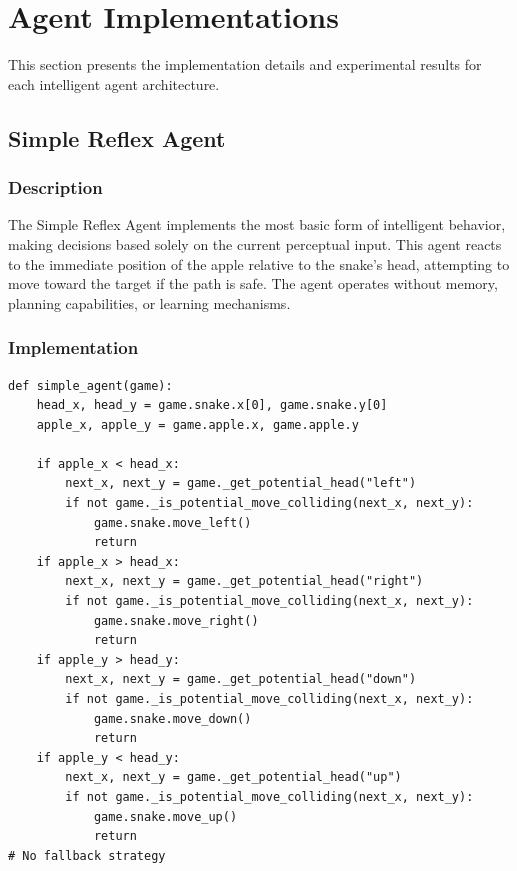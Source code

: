 \documentclass[11pt,a4paper]{article}
\begin{document}
\section{Agent Implementations}

This section presents the implementation details and experimental results for each intelligent agent architecture.

\subsection{Simple Reflex Agent}

\subsubsection{Description}
The Simple Reflex Agent implements the most basic form of intelligent behavior, making decisions based solely on the current perceptual input. This agent reacts to the immediate position of the apple relative to the snake's head, attempting to move toward the target if the path is safe. The agent operates without memory, planning capabilities, or learning mechanisms.

\subsubsection{Implementation}
\begin{lstlisting}[caption=Simple Reflex Agent]
def simple_agent(game):
    head_x, head_y = game.snake.x[0], game.snake.y[0]
    apple_x, apple_y = game.apple.x, game.apple.y

    if apple_x < head_x:
        next_x, next_y = game._get_potential_head("left")
        if not game._is_potential_move_colliding(next_x, next_y):
            game.snake.move_left()
            return
    if apple_x > head_x:
        next_x, next_y = game._get_potential_head("right")
        if not game._is_potential_move_colliding(next_x, next_y):
            game.snake.move_right()
            return
    if apple_y > head_y:
        next_x, next_y = game._get_potential_head("down")
        if not game._is_potential_move_colliding(next_x, next_y):
            game.snake.move_down()
            return
    if apple_y < head_y:
        next_x, next_y = game._get_potential_head("up")
        if not game._is_potential_move_colliding(next_x, next_y):
            game.snake.move_up()
            return
# No fallback strategy
\end{lstlisting}
\end{document}
